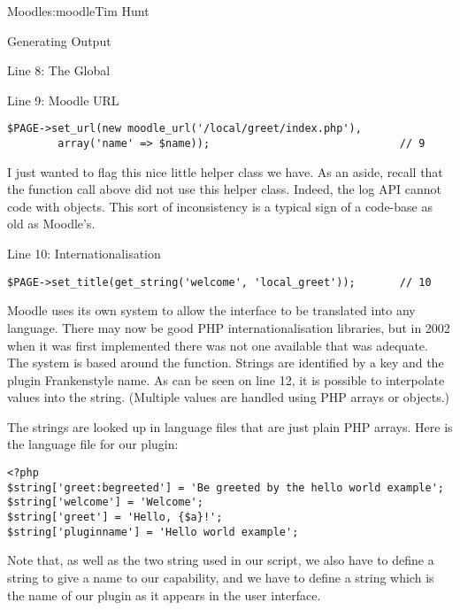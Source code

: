 \begin{aosachapter}{Moodle}{s:moodle}{Tim Hunt}
\begin{aosasect1}{Generating Output}
\begin{aosasect2}{Line 8: The  Global}
\end{aosasect2}

\begin{aosasect2}{Line 9: Moodle URL}

\begin{verbatim}
$PAGE->set_url(new moodle_url('/local/greet/index.php'),
        array('name' => $name));                              // 9
\end{verbatim}

I just wanted to flag this nice little helper class we have. As an
aside, recall that the  function call above did not
use this helper class. Indeed, the log API cannot code with
 objects. This sort of inconsistency is a typical
sign of a code-base as old as Moodle's.

\end{aosasect2}

\begin{aosasect2}{Line 10: Internationalisation}

\begin{verbatim}
$PAGE->set_title(get_string('welcome', 'local_greet'));       // 10
\end{verbatim}

Moodle uses its own system to allow the interface to be translated
into any language. There may now be good PHP internationalisation
libraries, but in 2002 when it was first implemented there was not one
available that was adequate. The system is based around the
 function. Strings are identified by a key and the
plugin Frankenstyle name. As can be seen on line 12, it is possible to
interpolate values into the string. (Multiple values are handled using
PHP arrays or objects.)

The strings are looked up in language files that are just plain PHP
arrays. Here is the language file
 for our plugin:

\begin{verbatim}
<?php
$string['greet:begreeted'] = 'Be greeted by the hello world example';
$string['welcome'] = 'Welcome';
$string['greet'] = 'Hello, {$a}!';
$string['pluginname'] = 'Hello world example';
\end{verbatim}

Note that, as well as the two string used in our script, we also have
to define a string to give a name to our capability, and we have to
define a string  which is the name of our plugin as
it appears in the user interface.


\end{aosasect2}
\end{aosasect1}
\end{aosachapter}
